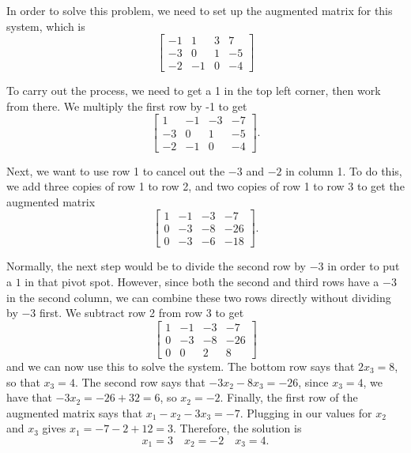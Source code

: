 \begin{exampleSol}
In order to solve this problem, we need to set up the augmented matrix for this system, which is
\begin{equation*}
\left[
\begin{array}{ccc|c}
-1 & 1 & 3 & 7 \\
-3 & 0 & 1 & -5 \\
-2 & -1 & 0 & -4
\end{array}
\right]
\end{equation*}

To carry out the process, we need to get a 1 in the top left corner, then work from there. We multiply the first row by -1 to get 
\begin{equation*}
\left[
\begin{array}{ccc|c}
1 & -1 & -3 & -7 \\
-3 & 0 & 1 & -5 \\
-2 & -1 & 0 & -4
\end{array}
\right].
\end{equation*}

Next, we want to use row 1 to cancel out the $-3$ and $-2$ in column 1. To do this, we add three copies of row 1 to row 2, and two copies of row 1 to row 3 to get the augmented matrix
\begin{equation*}
\left[
\begin{array}{ccc|c}
1 & -1 & -3 & -7 \\
0 & -3 & -8 & -26 \\
0 & -3 & -6 & -18
\end{array}
\right].
\end{equation*}

Normally, the next step would be to divide the second row by $-3$ in order to put a $1$ in that pivot spot. However, since both the second and third rows have a $-3$ in the second column, we can combine these two rows directly without dividing by $-3$ first. We subtract row 2 from row 3 to get
\begin{equation*}
\left[
\begin{array}{ccc|c}
1 & -1 & -3 & -7 \\
0 & -3 & -8 & -26 \\
0 & 0 & 2 & 8
\end{array}
\right]
\end{equation*}
and we can now use this to solve the system. The bottom row says that $2x_3 = 8$, so that $x_3 = 4$. The second row says that $-3x_2 - 8x_3 = -26$, since $x_3 = 4$, we have that $-3x_2 = -26 + 32 = 6$, so $x_2 = -2$. Finally, the first row of the augmented matrix says that $x_1 - x_2 - 3x_3 = -7$. Plugging in our values for $x_2$ and $x_3$ gives $x_1 = -7 - 2 + 12 = 3$. Therefore, the solution is
\begin{equation*}
x_1 = 3 \quad x_2 = -2 \quad x_3 = 4.
\end{equation*}
\end{exampleSol}

